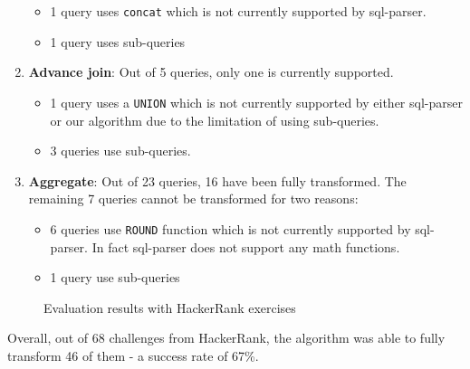 \begin{enumerate}
\begin{itemize}
        \item 1 query uses \texttt{concat} which is not currently supported by sql-parser.
        \item 1 query uses sub-queries
    \end{itemize}
    \item \textbf{Advance join}: Out of 5 queries, only one is currently supported.
    \begin{itemize}
        \item 1 query uses a \texttt{UNION} which is not currently supported by either sql-parser or our algorithm due to the limitation of using sub-queries.
        \item 3 queries use sub-queries.
    \end{itemize}
    \item \textbf{Aggregate}: Out of 23 queries, 16 have been fully transformed. The remaining 7 queries cannot be transformed for two reasons:
    \begin{itemize}
        \item 6 queries use \texttt{ROUND} function which is not currently supported by sql-parser. In fact sql-parser does not support any math functions.
        \item 1 query use sub-queries
    \end{itemize}
\end{enumerate}

\begin{figure}
\centering
{}
\caption{Evaluation results with HackerRank exercises}
\label{fig:my_label}
\end{figure}

Overall, out of 68 challenges from HackerRank, the algorithm was able to fully transform 46 of them - a success rate of 67\%. 

